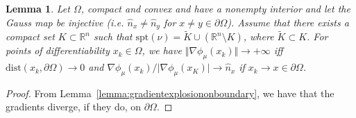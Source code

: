 \documentclass{amsart}
\theoremstyle{lemma}
\newtheorem{lemma}[theorem]{Lemma}
\theoremstyle{remark}
\begin{document}
\begin{lemma}\label{lemma:gradientexplosion}
Let $\Omega$, compact and convex and have a nonempty interior and let the Gauss map be injective (i.e. $\hat{n}_{x} \neq \hat{n}_{y}$ for $x \neq y \in \partial \Omega$). Assume that there exists a compact set $K \subset \mathbb{R}^n$ such that $\text{spt}(\nu) = \tilde{K} \cup (\mathbb{R}^n \setminus K)$, where $\tilde{K} \subset K$. For points of differentiability $x_k \in \Omega$, we have $\Vert \nabla \phi_{\mu}(x_k) \Vert \rightarrow + \infty$ iff $\text{dist}(x_k, \partial \Omega) \rightarrow 0$ and $\nabla \phi_{\mu}(x_k) /\vert \nabla \phi_{\mu}(x_K) \vert \rightarrow \hat{n}_{x}$ if $x_k \rightarrow x \in \partial \Omega$.
\end{lemma}
\begin{proof}
From Lemma~\ref{lemma:gradientexplosiononboundary}, we have that the gradients diverge, if they do, on $\partial \Omega$.


\end{proof}
\end{document}
